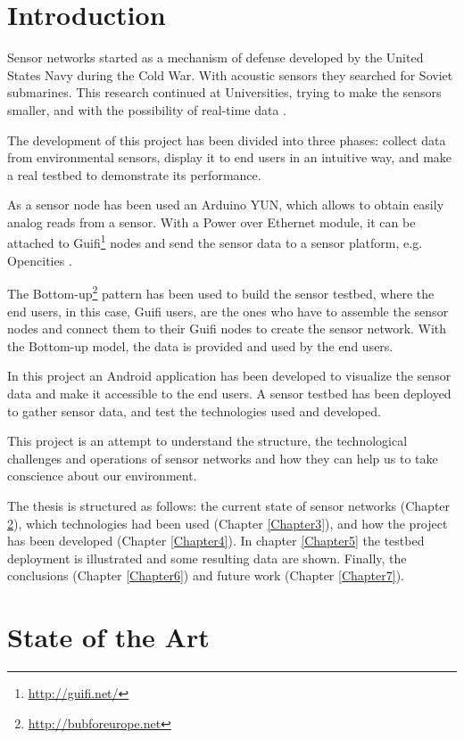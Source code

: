 \documentclass[12pt, a4paper,twoside]{tesi_upf}
\begin{document}
\mainmatter
\chapter{Introduction}
\label{Chapter1}
	
	Sensor networks started as a mechanism of defense developed by the United States Navy during the Cold War. With acoustic sensors they searched for Soviet submarines. This research continued at Universities, trying to make the sensors smaller, and with the possibility of real-time data \cite{chong2003sensor}.
	
  The development of this project has been divided into three phases: collect data from environmental sensors, display it to end users in an intuitive way, and make a real testbed to demonstrate its performance.
  
  As a sensor node has been used an Arduino\cite{arduino} YUN, which allows to obtain easily analog reads from a sensor. With a Power over Ethernet module, it can be attached to Guifi\footnote{\url{http://guifi.net/}} nodes and send the sensor data to a sensor platform, e.g. Opencities \cite{opencities}.

  The Bottom-up\footnote{\url{http://bubforeurope.net}} pattern has been used to build the sensor testbed, where the end users, in this case, Guifi users, are the ones who have to assemble the sensor nodes and connect them to their Guifi nodes to create the sensor network. With the Bottom-up model, the data is provided and used by the end users.

  In this project an Android application has been developed to visualize the sensor data and make it accessible to the end users.
  A sensor testbed has been deployed to gather sensor data, and test the technologies used and developed.
  
  This project is an attempt to understand the structure, the technological challenges and operations of sensor networks and how they can help us to take conscience about our environment.

  The thesis is structured as follows: the current state of sensor networks (Chapter \ref{Chapter2}), which technologies had been used (Chapter \ref{Chapter3}), and how the project has been developed (Chapter \ref{Chapter4}). 
  In chapter \ref{Chapter5} the testbed deployment is illustrated and some resulting data are shown.
  Finally, the conclusions (Chapter \ref{Chapter6}) and future work (Chapter \ref{Chapter7}).
  
\chapter{State of the Art}
\label{Chapter2}
  
\end{document}
